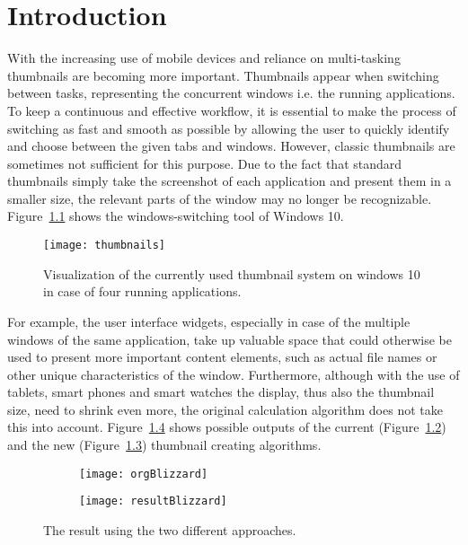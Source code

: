 \documentclass[draft,final]{vutinfth} %
\begin{document}
	\chapter{Introduction}
	With the increasing use of mobile devices and reliance on multi-tasking thumbnails are becoming more important.
	Thumbnails appear when switching between tasks, representing the concurrent windows i.e. the running applications.
	To keep a continuous and effective workflow, it is essential to make the process of switching as fast and smooth as possible by allowing the user to quickly identify and choose between the given tabs and windows. 
	However, classic thumbnails are sometimes not sufficient for this purpose. 
	Due to the fact that standard thumbnails simply take the screenshot of each application and present them in a smaller size, the relevant parts of the window may no longer be recognizable.
	Figure~\ref{fig:thumbnails} shows the windows-switching tool of Windows 10.
	\begin{figure}[H]
		\centering		
		\texttt{[image: thumbnails]}
		\caption{Visualization of the currently used thumbnail system on windows 10 in case of four running applications.}
		\label{fig:thumbnails}
	\end{figure} 
	For example, the user interface widgets, especially in case of the multiple windows of the same application, take up valuable space that could otherwise be used to present more important content elements, such as actual file names or other unique characteristics of the window.
	Furthermore, although with the use of tablets, smart phones and smart watches the display, thus also the thumbnail size, need to shrink even more, the original calculation algorithm does not take this into account.
	Figure~\ref{fig:introo} shows possible outputs of the current (Figure~\ref{fig:introo:org}) and the new (Figure~\ref{fig:introo:res}) thumbnail creating algorithms.\par 
	\begin{figure}[h]
		\centering
		\begin{subfigure}[b]{0.45\columnwidth}
			\centering
			\texttt{[image: orgBlizzard]}
			\label{fig:introo:org}
		\end{subfigure}
		\begin{subfigure}[b]{0.45\columnwidth}
			\centering
			\texttt{[image: resultBlizzard]}
			\label{fig:introo:res}
		\end{subfigure}
		\caption{The result using the two different approaches.}
		\label{fig:introo} %
	\end{figure}
\end{document}
